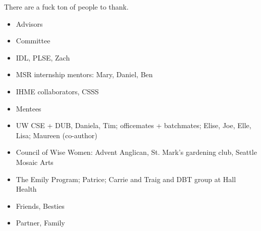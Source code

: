 There are a fuck ton of people to thank. 
\begin{itemize}
    \item Advisors 
    \item Committee
    \item IDL, PLSE, Zach
    \item MSR internship mentors: Mary, Daniel, Ben 
    \item IHME collaborators, CSSS
    \item Mentees
    \item UW CSE + DUB, Daniela, Tim; officemates + batchmates; Elise, Joe, Elle, Lisa; Maureen (co-author)
    \item Council of Wise Women: Advent Anglican, St. Mark's gardening club, Seattle Mosaic Arts
    \item The Emily Program; Patrice; Carrie and Traig and DBT group at Hall Health
    \item Friends, Besties
    \item Partner, Family
\end{itemize}
















